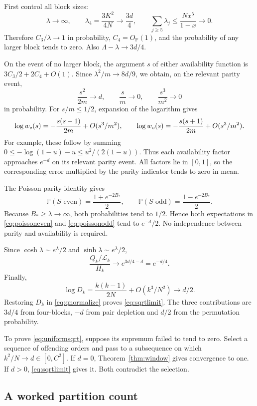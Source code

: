 \documentclass[11pt]{article}
\theoremstyle{definition}
\theoremstyle{remark}
\newcommand{\PP}{\mathbb P}
\newcommand{\1}{\mathbf 1}
\begin{document}
First control all block sizes:
\[
\lambda\to\infty,\qquad
\lambda_4=\frac{3K^2}{4N}\to\frac{3d}4,\qquad
\sum_{j\ge5}\lambda_j\le\frac{Nx^5}{1-x}\to0.
\]
Therefore $C_3/\lambda\to1$ in probability, $C_4=O_{\PP}(1)$, and the probability of any larger block tends to zero. Also $\Lambda-\lambda\to3d/4$.

On the event of no larger block, the argument $s$ of either availability function is $3C_3/2+2C_4+O(1)$. Since $\lambda^2/m\to8d/9$, we obtain, on the relevant parity event,
\[
\frac{s^2}{2m}\to d,\qquad \frac sm\to0,\qquad \frac{s^3}{m^2}\to0
\]
in probability. For $s/m\le1/2$, expansion of the logarithm gives
\[
\log w_{\rm e}(s)=-\frac{s(s-1)}{2m}+O(s^3/m^2),\qquad
\log w_{\rm o}(s)=-\frac{s(s+1)}{2m}+O(s^3/m^2).
\]
For example, these follow by summing
$0\le-\log(1-u)-u\le u^2/(2(1-u))$.
Thus each availability factor approaches $e^{-d}$ on its relevant parity event. All factors lie in $[0,1]$, so the corresponding error multiplied by the parity indicator tends to zero in mean.

The Poisson parity identity gives
\[
\PP(S\text{ even})=\frac{1+e^{-2B_*}}2,\qquad
\PP(S\text{ odd})=\frac{1-e^{-2B_*}}2.
\]
Because $B_*\ge\lambda\to\infty$, both probabilities tend to $1/2$. Hence both expectations in \eqref{eq:poissoneven} and \eqref{eq:poissonodd} tend to $e^{-d}/2$. No independence between parity and availability is required.

Since $\cosh\lambda\sim e^\lambda/2$ and $\sinh\lambda\sim e^\lambda/2$,
\[
\frac{Q_k/\mathcal L_k}{H_k}\longrightarrow e^{3d/4-d}=e^{-d/4}.
\]
Finally,
\[
\log D_k=\frac{k(k-1)}{2N}+O(k^3/N^2)\longrightarrow d/2.
\]
Restoring $D_k$ in \eqref{eq:qnormalize} proves \eqref{eq:sqrtlimit}. The three contributions are $3d/4$ from four-blocks, $-d$ from pair depletion and $d/2$ from the permutation probability.

To prove \eqref{eq:uniformsqrt}, suppose its supremum failed to tend to zero. Select a sequence of offending orders and pass to a subsequence on which $k^2/N\to d\in[0,C^2]$. If $d=0$, Theorem~\ref{thm:window} gives convergence to one. If $d>0$, \eqref{eq:sqrtlimit} gives it. Both contradict the selection.

\subsection{A worked partition count}
\end{document}

